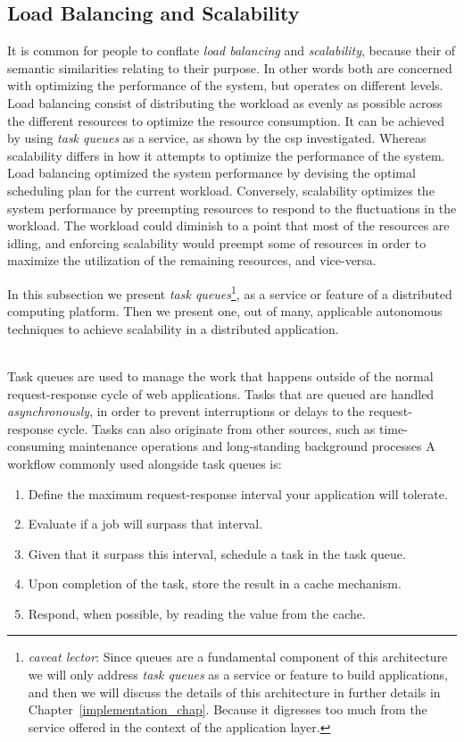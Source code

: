 \documentclass[12pt, titlepage]{uo_temp}
\begin{document}
     \subsection{Load Balancing and Scalability}
     It is common for people to conflate \emph{load balancing} and \emph{scalability},
     because their of semantic similarities relating to their purpose. In other words both
     are concerned with optimizing the performance of the system, but operates on
     different levels. Load balancing consist of distributing the workload as evenly as
     possible across the different resources to optimize the resource consumption. It can
     be achieved by using \emph{task queues} as a service, as shown by the \gls{csp}
     investigated. Whereas scalability differs in how it attempts to optimize the
     performance of the system. Load balancing optimized the system performance by
     devising the optimal scheduling plan for the current workload. Conversely,
     scalability optimizes the system performance by preempting resources to respond to
     the fluctuations in the workload. The workload could diminish to a point that most of
     the resources are idling, and enforcing scalability would preempt some of
     resources in order to maximize the utilization of the remaining resources, and
     vice-versa. 

     In this subsection we present \emph{task queues}\footnote{\emph{caveat lector}: Since
       queues are a fundamental component of this architecture we will only address
       \emph{task queues} as a service or feature to build applications, and then we will
       discuss the details of this architecture in further details in
       Chapter~\ref{implementation_chap}. Because it digresses too much from the service
       offered in the context of the application layer.}, as a service or feature of a
     distributed computing platform. Then we present one, out of many, applicable
     autonomous techniques to achieve scalability in a distributed application.
     
     \\ Task queues are used to manage the work that happens outside of the normal
     request-response cycle of web applications. Tasks that are queued are handled
     \emph{asynchronously}, in order to prevent interruptions or delays to the
     request-response cycle. Tasks can also originate from other sources, such as
     time-consuming maintenance operations and long-standing background processes A
     workflow commonly used alongside task queues is:
     \begin{enumerate}
     \item Define the maximum request-response interval your application will tolerate. 
     \item Evaluate if a job will surpass that interval.
     \item Given that it surpass this interval, schedule a task in the task queue.
     \item Upon completion of the task, store the result in a cache mechanism.
     \item Respond, when possible, by reading the value from the cache.
     \end{enumerate}
     
\end{document}
